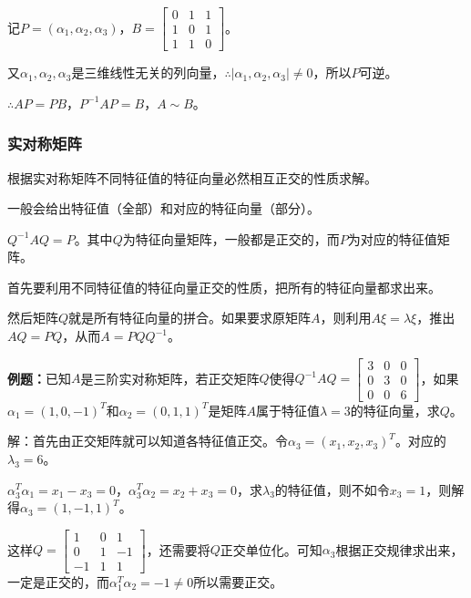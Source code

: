 记$P=(\alpha_1,\alpha_2,\alpha_3)$，$B=\left[\begin{array}{ccc}
    0 & 1 & 1 \\
    1 & 0 & 1 \\
    1 & 1 & 0
\end{array}\right]$。\medskip

又$\alpha_1,\alpha_2,\alpha_3$是三维线性无关的列向量，$\therefore\vert\alpha_1,\alpha_2,\alpha_3\vert\neq0$，所以$P$可逆。

$\therefore AP=PB$，$P^{-1}AP=B$，$A\sim B$。

\paragraph{}

\subsubsection{实对称矩阵}

根据实对称矩阵不同特征值的特征向量必然相互正交的性质求解。

一般会给出特征值（全部）和对应的特征向量（部分）。

$Q^{-1}AQ=P$。其中$Q$为特征向量矩阵，一般都是正交的，而$P$为对应的特征值矩阵。

首先要利用不同特征值的特征向量正交的性质，把所有的特征向量都求出来。

然后矩阵$Q$就是所有特征向量的拼合。如果要求原矩阵$A$，则利用$A\xi=\lambda\xi$，推出$AQ=PQ$，从而$A=PQQ^{-1}$。

\textbf{例题：}已知$A$是三阶实对称矩阵，若正交矩阵$Q$使得$Q^{-1}AQ=\left[\begin{array}{ccc}
    3 & 0 & 0 \\
    0 & 3 & 0 \\
    0 & 0 & 6
\end{array}\right]$，如果$\alpha_1=(1,0,-1)^T$和$\alpha_2=(0,1,1)^T$是矩阵$A$属于特征值$\lambda=3$的特征向量，求$Q$。

解：首先由正交矩阵就可以知道各特征值正交。令$\alpha_3=(x_1,x_2,x_3)^T$。对应的$\lambda_3=6$。

$\alpha_3^T\alpha_1=x_1-x_3=0$，$\alpha_3^T\alpha_2=x_2+x_3=0$，求$\lambda_3$的特征值，则不如令$x_3=1$，则解得$\alpha_3=(1,-1,1)^T$。

这样$Q=\left[\begin{array}{ccc}
    1 & 0 & 1 \\
    0 & 1 & -1 \\
    -1 & 1 & 1
\end{array}\right]$，还需要将$Q$正交单位化。可知$\alpha_3$根据正交规律求出来，一定是正交的，而$\alpha_1^T\alpha_2=-1\neq0$所以需要正交。

